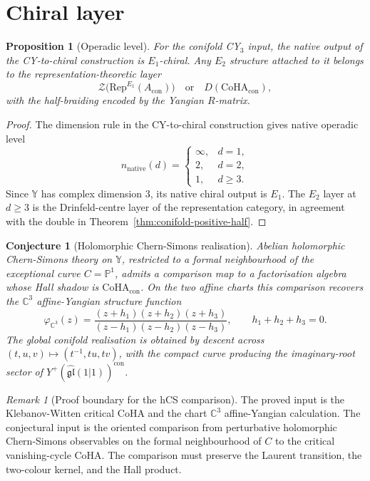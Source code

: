 \documentclass[11pt]{amsart}
\providecommand{\C}{\mathbb{C}}
\providecommand{\bP}{\mathbb{P}}
\providecommand{\bY}{\mathbb{Y}}
\providecommand{\Rep}{\mathrm{Rep}}
\providecommand{\Eone}{E_1}
\providecommand{\Etwo}{E_2}
\providecommand{\CoHA}{\mathrm{CoHA}}
\theoremstyle{plain}
\newtheorem{proposition}[theorem]{Proposition}
\newtheorem{conjecture}[theorem]{Conjecture}
\theoremstyle{definition}
\theoremstyle{remark}
\newtheorem{remark}[theorem]{Remark}
\begin{document}
\section{Chiral layer}

\begin{proposition}[Operadic level]\label{prop:conifold-operadic-level}
For the conifold CY\(_3\) input, the native output of the
CY-to-chiral construction is \(\Eone\)-chiral.  Any \(\Etwo\) structure
attached to it belongs to the representation-theoretic layer
\[
  \mathcal{Z}\bigl(\Rep^{\Eone}(A_{\mathrm{con}})\bigr)
  \quad\text{or}\quad
  D(\CoHA_{\mathrm{con}}),
\]
with the half-braiding encoded by the Yangian \(R\)-matrix.
\end{proposition}

\begin{proof}
The dimension rule in the CY-to-chiral construction gives native
operadic level
\[
  n_{\mathrm{native}}(d)=
  \begin{cases}
  \infty, & d=1,\\
  2, & d=2,\\
  1, & d\geq 3 .
  \end{cases}
\]
Since \(\bY\) has complex dimension \(3\), its native chiral output is
\(\Eone\).  The \(\Etwo\) layer at \(d\geq 3\) is the Drinfeld-centre
layer of the representation category, in agreement with the double in
Theorem~\ref{thm:conifold-positive-half}.
\end{proof}

\begin{conjecture}[Holomorphic Chern-Simons realisation]\label{conj:hcs-realisation}
Abelian holomorphic Chern-Simons theory on \(\bY\), restricted to a
formal neighbourhood of the exceptional curve \(C=\bP^1\), admits a
comparison map to a factorisation algebra whose Hall shadow is
\(\CoHA_{\mathrm{con}}\).  On the two affine charts this comparison
recovers the \(\C^3\) affine-Yangian structure function
\[
  \varphi_{\C^3}(z)=
  \frac{(z+h_1)(z+h_2)(z+h_3)}
       {(z-h_1)(z-h_2)(z-h_3)},
  \qquad h_1+h_2+h_3=0 .
\]
The global conifold realisation is obtained by descent across
\((t,u,v)\mapsto(t^{-1},tu,tv)\), with the compact curve producing the
imaginary-root sector of \(Y^+(\widehat{\mathfrak{gl}}(1|1))^{\mathrm{con}}\).
\end{conjecture}

\begin{remark}[Proof boundary for the hCS comparison]\label{rem:hcs-proof-boundary}
The proved input is the Klebanov-Witten critical CoHA and the chart
\(\C^3\) affine-Yangian calculation.  The conjectural input is the
oriented comparison from perturbative holomorphic Chern-Simons
observables on the formal neighbourhood of \(C\) to the critical
vanishing-cycle CoHA.  The comparison must preserve the Laurent
transition, the two-colour kernel, and the Hall product.
\end{remark}
\end{document}
